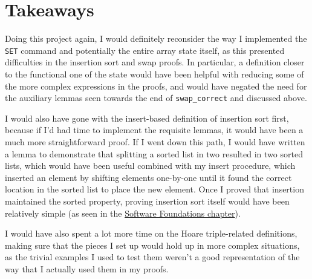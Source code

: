\documentclass{article}
\begin{document}
    \section{Takeaways}
    Doing this project again, I would definitely reconsider the way I implemented the \texttt{SET} command and potentially the entire array state itself, as this presented difficulties in the insertion sort and swap proofs. In particular, a definition closer to the functional one of the state would have been helpful with reducing some of the more complex expressions in the proofs, and would have negated the need for the auxiliary lemmas seen towards the end of \texttt{swap\_correct} and discussed above.

    I would also have gone with the insert-based definition of insertion sort first, because if I'd had time to implement the requisite lemmas, it would have been a much more straightforward proof. If I went down this path, I would have written a lemma to demonstrate that splitting a sorted list in two resulted in two sorted lists, which would have been useful combined with my insert procedure, which inserted an element by shifting elements one-by-one until it found the correct location in the sorted list to place the new element. Once I proved that insertion maintained the sorted property, proving insertion sort itself would have been relatively simple (as seen in the \href{https://softwarefoundations.cis.upenn.edu/vfa-current/Sort.html}{Software Foundations chapter}).

    I would have also spent a lot more time on the Hoare triple-related definitions, making sure that the pieces I set up would hold up in more complex situations, as the trivial examples I used to test them weren't a good representation of the way that I actually used them in my proofs.
\end{document}
